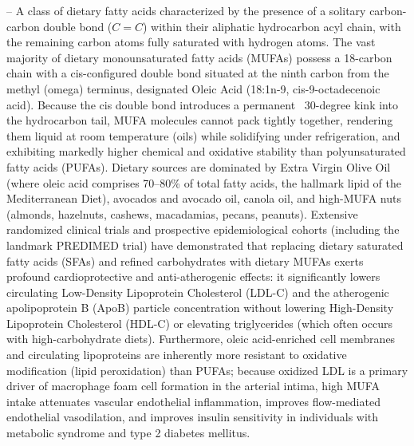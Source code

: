 -- A class of dietary fatty acids characterized by the presence of a solitary carbon-carbon double bond ($C=C$) within their aliphatic hydrocarbon acyl chain, with the remaining carbon atoms fully saturated with hydrogen atoms. The vast majority of dietary monounsaturated fatty acids (MUFAs) possess a 18-carbon chain with a cis-configured double bond situated at the ninth carbon from the methyl (omega) terminus, designated Oleic Acid (18:1n-9, cis-9-octadecenoic acid). Because the cis double bond introduces a permanent ~30-degree kink into the hydrocarbon tail, MUFA molecules cannot pack tightly together, rendering them liquid at room temperature (oils) while solidifying under refrigeration, and exhibiting markedly higher chemical and oxidative stability than polyunsaturated fatty acids (PUFAs). Dietary sources are dominated by Extra Virgin Olive Oil (where oleic acid comprises 70--80\% of total fatty acids, the hallmark lipid of the Mediterranean Diet), avocados and avocado oil, canola oil, and high-MUFA nuts (almonds, hazelnuts, cashews, macadamias, pecans, peanuts). Extensive randomized clinical trials and prospective epidemiological cohorts (including the landmark PREDIMED trial) have demonstrated that replacing dietary saturated fatty acids (SFAs) and refined carbohydrates with dietary MUFAs exerts profound cardioprotective and anti-atherogenic effects: it significantly lowers circulating Low-Density Lipoprotein Cholesterol (LDL-C) and the atherogenic apolipoprotein B (ApoB) particle concentration without lowering High-Density Lipoprotein Cholesterol (HDL-C) or elevating triglycerides (which often occurs with high-carbohydrate diets). Furthermore, oleic acid-enriched cell membranes and circulating lipoproteins are inherently more resistant to oxidative modification (lipid peroxidation) than PUFAs; because oxidized LDL is a primary driver of macrophage foam cell formation in the arterial intima, high MUFA intake attenuates vascular endothelial inflammation, improves flow-mediated endothelial vasodilation, and improves insulin sensitivity in individuals with metabolic syndrome and type 2 diabetes mellitus.


